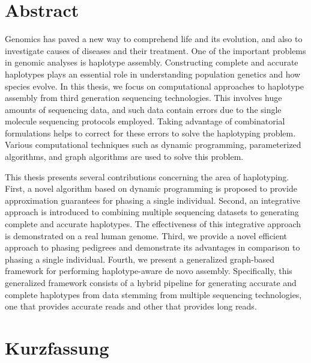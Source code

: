 \chapter*{Abstract}

Genomics has paved a new way to comprehend life and its evolution, and also to investigate causes of diseases and their treatment.
One of the important problems in genomic analyses is haplotype assembly. Constructing complete and accurate haplotypes plays an essential role in understanding population genetics and how species evolve.
In this thesis, we focus on computational approaches to haplotype assembly from third generation sequencing technologies.
This involves huge amounts of sequencing data, and such data contain errors due to the single molecule sequencing protocols employed. 
Taking advantage of combinatorial formulations helps to correct for these errors to solve the haplotyping problem.
Various computational techniques such as dynamic programming, parameterized algorithms, and graph algorithms are used to solve this problem.

This thesis presents several contributions concerning the area of haplotyping. First, a novel algorithm based on dynamic programming is proposed to provide approximation guarantees for phasing a single individual.
Second, an integrative approach is introduced to combining multiple sequencing datasets to generating complete and accurate haplotypes.
The effectiveness of this integrative approach is demonstrated on a real human genome.
Third, we provide a novel efficient approach to phasing pedigrees and demonstrate its advantages in comparison to phasing a single individual.
Fourth, we present a generalized graph-based framework for performing haplotype-aware de novo assembly. 
Specifically, this generalized framework consists of a hybrid pipeline for generating accurate and complete haplotypes from data stemming from multiple sequencing technologies, one that provides accurate reads and other
that provides long reads.


\chapter*{Kurzfassung}

